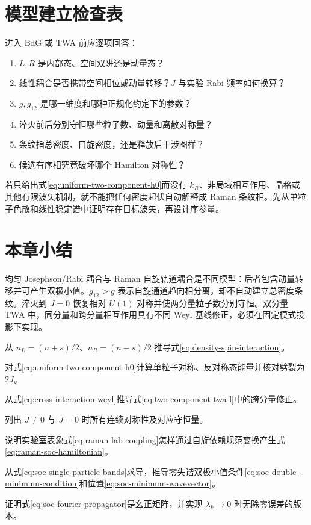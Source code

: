 \section{模型建立检查表}

进入 BdG 或 TWA 前应逐项回答：
\begin{enumerate}
  \item $L,R$ 是内部态、空间双阱还是动量态？
  \item 线性耦合是否携带空间相位或动量转移？$J$ 与实验 Rabi 频率如何换算？
  \item $g,g_{12}$ 是哪一维度和哪种正规化约定下的参数？
  \item 淬火前后分别守恒哪些粒子数、动量和离散对称量？
  \item 条纹指总密度、自旋密度，还是释放后干涉图样？
  \item 候选有序相究竟破坏哪个 Hamilton 对称性？
\end{enumerate}

\begin{chaptercheck}
若只给出式\eqref{eq:uniform-two-component-h0}而没有 $k_R$、非局域相互作用、晶格或其他有限波矢机制，就不能把任何密度起伏自动解释成 Raman 条纹相。先从单粒子色散和线性稳定谱中证明存在目标波矢，再设计序参量。
\end{chaptercheck}

\section*{本章小结}

均匀 Josephson/Rabi 耦合与 Raman 自旋轨道耦合是不同模型：后者包含动量转移并可产生双极小值。$g_{12}>g$ 表示自旋通道趋向相分离，却不自动建立总密度条纹。淬火到 $J=0$ 恢复相对 $U(1)$ 对称并使两分量粒子数分别守恒。双分量 TWA 中，同分量和跨分量相互作用具有不同 Weyl 基线修正，必须在固定模式投影下实现。

\begin{exercises}
  \item 从 $n_L=(n+s)/2$、$n_R=(n-s)/2$ 推导式\eqref{eq:density-spin-interaction}。
  \item 对式\eqref{eq:uniform-two-component-h0}计算单粒子对称、反对称态能量并核对劈裂为 $2J$。
  \item 从式\eqref{eq:cross-interaction-weyl}推导式\eqref{eq:two-component-twa-l}中的跨分量修正。
  \item 列出 $J\neq0$ 与 $J=0$ 时所有连续对称性及对应守恒量。
  \item 说明实验室表象式\eqref{eq:raman-lab-coupling}怎样通过自旋依赖规范变换产生式\eqref{eq:raman-soc-hamiltonian}。
  \item 从式\eqref{eq:soc-single-particle-bands}求导，推导零失谐双极小值条件\eqref{eq:soc-double-minimum-condition}和位置\eqref{eq:soc-minimum-wavevector}。
  \item 证明式\eqref{eq:soc-fourier-propagator}是幺正矩阵，并实现 $\lambda_k\to0$ 时无除零误差的版本。
\end{exercises}
